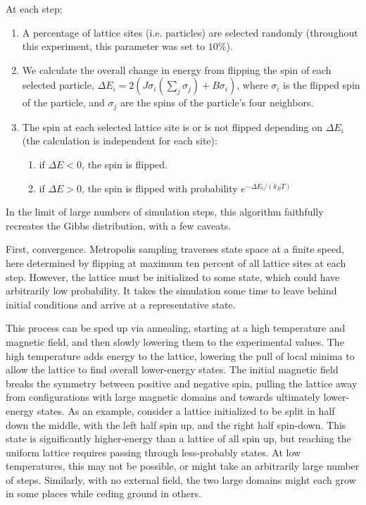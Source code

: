 \documentclass[letter,scriptaddress,twocolumn, prl]{revtex4}
\begin{document}
At each step:
\begin{enumerate}
	\item A percentage of lattice sites (i.e. particles) are selected randomly (throughout this experiment, this parameter was set to $10\%$).
	\item We calculate the overall change in energy from flipping the spin of each selected particle, $\Delta E_i = 2(J\sigma_i(\sum_j\sigma_j) + B\sigma_i)$, where $\sigma_i$ is the flipped spin of the particle, and $\sigma_j$ are the spins of the particle's four neighbors.
	\item The spin at each selected lattice site is or is not flipped depending on $\Delta E_i$ (the calculation is independent for each site):
	\begin{enumerate}
		\item if $\Delta E < 0$, the spin is flipped.
		\item if $\Delta E > 0$, the spin is flipped with probability $e^{-\Delta E_i/(k_BT)}$
	\end{enumerate}
\end{enumerate}

In the limit of large numbers of simulation steps, this algorithm faithfully recreates the Gibbs distribution, with a few caveats.

First, convergence. Metropolis sampling traverses state space at a finite speed, here determined by flipping at maximum ten percent of all lattice sites at each step. However, the lattice must be initialized to some state, which could have arbitrarily low probability. It takes the simulation some time to leave behind initial conditions and arrive at a representative state. 

This process can be sped up via annealing, starting at a high temperature and magnetic field, and then slowly lowering them to the experimental values. The high temperature adds energy to the lattice, lowering the pull of local minima to allow the lattice to find overall lower-energy states. The initial magnetic field breaks the symmetry between positive and negative spin, pulling the lattice away from configurations with large magnetic domains and towards ultimately lower-energy states. As an example, consider a lattice initialized to be split in half down the middle, with the left half spin up, and the right half spin-down. This state is significantly higher-energy than a lattice of all spin up, but reaching the uniform lattice requires passing through less-probably states. At low temperatures, this may not be possible, or might take an arbitrarily large number of steps. Similarly, with no external field, the two large domains might each grow in some places while ceding ground in others. 
\end{document}
